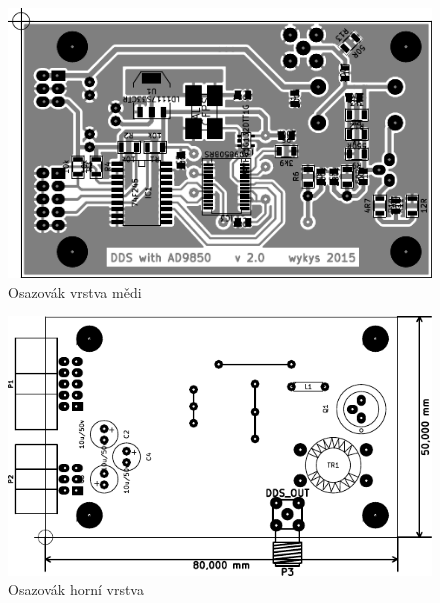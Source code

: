 	\begin{figure}[H]
    	\centering
    	\includegraphics[width=180mm]{img/ob.pdf}
    	\caption{Osazovák vrstva mědi}    		
  	\end{figure}
  	
	\begin{figure}[H]
    	\centering
    	\includegraphics[width=180mm]{img/ot.pdf}
    	\caption{Osazovák horní vrstva}    		
  	\end{figure}